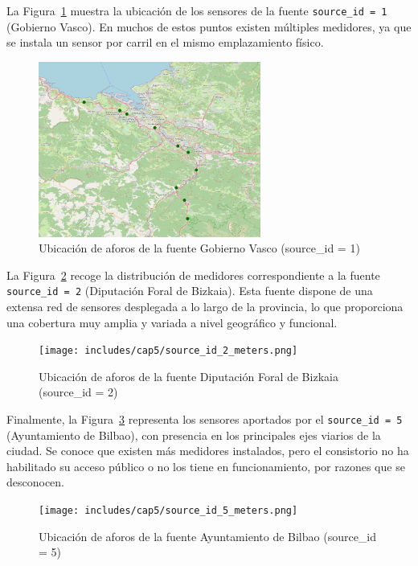 La Figura~\ref{fig:sourceid1_map} muestra la ubicación de los sensores de la fuente \texttt{source\_id = 1} (Gobierno Vasco). En muchos de estos puntos existen múltiples medidores, ya que se instala un sensor por carril en el mismo emplazamiento físico.

\begin{figure}[H]
	\centering
	\includegraphics[width=0.65\textwidth]{includes/cap5/source_id_1_meters.png}
	\caption{Ubicación de aforos de la fuente Gobierno Vasco (source\_id = 1)}
	\label{fig:sourceid1_map}
\end{figure}

La Figura~\ref{fig:sourceid2_map} recoge la distribución de medidores correspondiente a la fuente \texttt{source\_id = 2} (Diputación Foral de Bizkaia). Esta fuente dispone de una extensa red de sensores desplegada a lo largo de la provincia, lo que proporciona una cobertura muy amplia y variada a nivel geográfico y funcional.

\begin{figure}[H]
	\centering
	\texttt{[image: includes/cap5/source\_id\_2\_meters.png]}
	\caption{Ubicación de aforos de la fuente Diputación Foral de Bizkaia (source\_id = 2)}
	\label{fig:sourceid2_map}
\end{figure}

Finalmente, la Figura~\ref{fig:sourceid5_map} representa los sensores aportados por el \texttt{source\_id = 5} (Ayuntamiento de Bilbao), con presencia en los principales ejes viarios de la ciudad. Se conoce que existen más medidores instalados, pero el consistorio no ha habilitado su acceso público o no los tiene en funcionamiento, por razones que se desconocen.

\begin{figure}[H]
	\centering
	\texttt{[image: includes/cap5/source\_id\_5\_meters.png]}
	\caption{Ubicación de aforos de la fuente Ayuntamiento de Bilbao (source\_id = 5)}
	\label{fig:sourceid5_map}
\end{figure}

